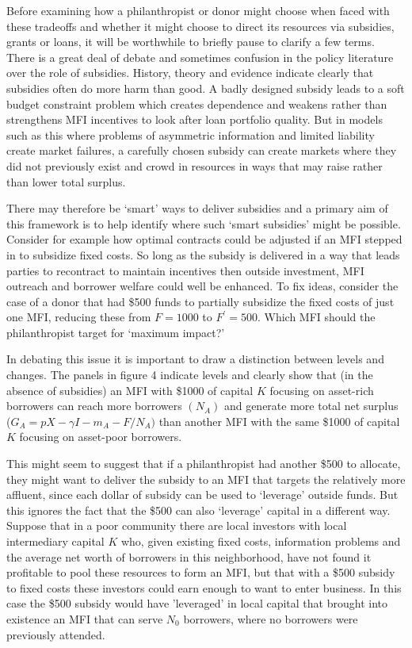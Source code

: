 \documentclass{article} %
\begin{document}
Before examining how a philanthropist or donor might choose when faced with these tradeoffs and whether it might choose to direct its resources via subsidies, grants or loans, it will be worthwhile to briefly pause to clarify a few terms.  There is a great deal of debate and sometimes confusion in the policy literature over the role of subsidies.  History, theory and evidence indicate clearly that subsidies often do more harm than good.  A badly designed subsidy leads to a soft budget constraint problem which creates dependence and weakens rather than strengthens MFI incentives to look after loan portfolio quality.  But in models such as this where problems of asymmetric information and limited liability create market failures, a carefully chosen subsidy can create markets where they did not previously exist and crowd in resources in ways that may raise rather than lower total surplus.  

There may therefore be `smart' ways to deliver subsidies and a primary aim of this framework is to help identify where such `smart subsidies' might be possible.  Consider for example how optimal contracts could be adjusted if an MFI stepped in to subsidize fixed costs.  So long as the subsidy is delivered in a way that leads parties to recontract to maintain incentives then outside investment, MFI outreach and borrower welfare could well be enhanced.  To fix ideas, consider the case of a donor that had \$500 funds to partially subsidize the fixed costs of just one MFI, reducing these from $F=1000$ to $F^{{'} } =500.$  Which MFI should the philanthropist target for `maximum impact?' 

In debating this issue it is important to draw a distinction between levels and changes.  The panels in figure 4 indicate levels and clearly show that (in the absence of subsidies) an MFI with \$1000 of capital $K$ focusing on asset-rich borrowers can reach more borrowers $(N_{A} )$ and generate more total net surplus ($G_{A} =pX-\gamma I-m_{A} -F/N_{A} )$ than another MFI with the same \$1000 of capital $K$ focusing on asset-poor borrowers.  

This might seem to suggest that if a philanthropist had another \$500 to allocate, they might want to deliver the subsidy to an MFI that targets the relatively more affluent, since each dollar of subsidy can be used to `leverage' outside funds.  But this ignores the fact that the \$500 can also `leverage' capital in a different way.  Suppose that in a poor community there are local investors with local intermediary capital $K$ who, given existing fixed costs, information problems and the average net worth of borrowers in this neighborhood, have not found it profitable to pool these resources to form an MFI, but that with a \$500 subsidy to fixed costs these investors could earn enough to want to enter business.  In this case the \$500 subsidy would have 'leveraged' in local capital that brought into existence an MFI that can serve $N_{0} $ borrowers, where no borrowers were previously attended. 
\end{document}
